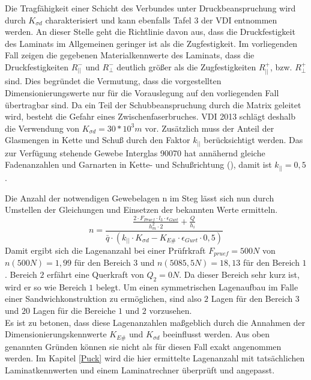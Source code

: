 \noindent Die Tragfähigkeit einer Schicht des Verbundes unter Druckbeanspruchung wird durch $ K_{\sigma d} $ charakterisiert und kann ebenfalls Tafel 3 der VDI entnommen werden. An dieser Stelle geht die Richtlinie davon aus, dass die Druckfestigkeit des Laminats im Allgemeinen geringer ist als die Zugfestigkeit. Im vorliegenden Fall zeigen die gegebenen Materialkennwerte des Laminats, dass die Druckfestigkeiten $ R_{||}^{-} $ und $ R_{\perp}^{-} $ deutlich größer als die Zugfestigkeiten $ R_{||}^{+} $, bzw. $ R_{\perp}^{+} $ sind. Dies begründet die Vermutung, dass die vorgestellten Dimensionierungswerte nur für die Vorauslegung auf den vorliegenden Fall übertragbar sind. Da ein Teil der Schubbeanspruchung durch die Matrix geleitet wird, besteht die Gefahr eines Zwischenfaserbruches. VDI 2013 schlägt deshalb die Verwendung von $ K_{\sigma d}=30*10^{3}m $ vor. Zusätzlich muss der Anteil der Glasmengen in Kette und Schuß durch den Faktor $ k_{||} $ berücksichtigt werden. Das zur Verfügung stehende Gewebe Interglas 90070 hat annähernd gleiche Fadenanzahlen und Garnarten in Kette- und Schußrichtung (\cite{item18}), damit ist $ k_{||}=0,5 $. 

Die Anzahl der notwendigen Gewebelagen n im Steg lässt sich nun durch Umstellen der Gleichungen und Einsetzen der bekannten Werte ermitteln.\\
\begin{equation}
	n=\frac{\frac{2\cdot F_{Pruef}\cdot l_{3}\cdot \epsilon_{Gurt}}{h_{m}^{2}\cdot 2}+\frac{Q}{h_{i}}}{\bar{q}\cdot \left(k_{||}\cdot K_{\sigma d}-K_{E\#}\cdot \epsilon_{Gurt}\cdot 0,5\right)}
\end{equation}
Damit ergibt sich die Lagenanzahl bei einer Prüfrkraft $ F_{pruef}=500N $ von $ n\left(500N\right)=1,99 $ für den Bereich $ 3 $ und $ n\left(5085,5N\right)=18,13 $ für den Bereich $ 1 $. Bereich $ 2 $ erfährt eine Querkraft von $Q_{2}=0N $. Da dieser Bereich sehr kurz ist, wird er so wie Bereich $ 1 $ belegt. Um einen symmetrischen Lagenaufbau im Falle einer Sandwichkonstruktion zu ermöglichen, sind also $ 2 $ Lagen für den Bereich $ 3 $ und $ 20 $ Lagen für die Bereiche $ 1 $ und $ 2 $ vorzusehen.\\

\noindent Es ist zu betonen, dass diese Lagenanzahlen maßgeblich durch die Annahmen der Dimensionierungskennwerte $ K_{E\#} $ und $ K_{\sigma d} $ beeinflusst werden. Aus oben genannten Gründen können sie nicht als für diesen Fall exakt angenommen werden. Im Kapitel \ref{Puck} wird die hier ermittelte Lagenanzahl mit tatsächlichen Laminatkennwerten und einem Laminatrechner überprüft und angepasst.\\
